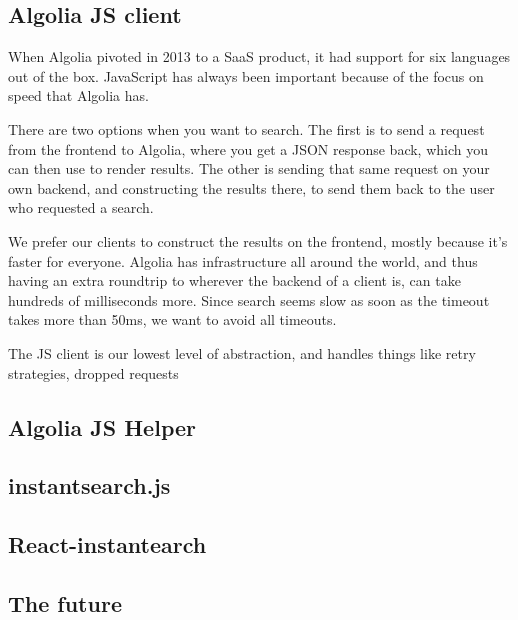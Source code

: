 \subsection{Algolia JS client} %
\label{sub:algolia_js_client}

When Algolia pivoted\cite{algolia-blog-saas} in 2013 to a SaaS product, it had support\cite{algolia-blog-lauch} for six languages out of the box. JavaScript has always been important because of the focus on speed that Algolia has.

There are two options when you want to search. The first is to send a request from the frontend to Algolia, where you get a JSON response back, which you can then use to render results. The other is sending that same request on your own backend, and constructing the results there, to send them back to the user who requested a search.

We prefer our clients to construct the results on the frontend, mostly because it's faster for everyone. Algolia has infrastructure\cite{algolia-infra} all around the world, and thus having an extra roundtrip to wherever the backend of a client is, can take hundreds of milliseconds more. Since search seems slow as soon as the timeout takes more than 50ms, we want to avoid all timeouts.

The JS client\cite{algolia-js-client} is our lowest level of abstraction, and handles things like retry strategies, dropped requests


\subsection{Algolia JS Helper} %
\label{sub:algolia_js_helper}


\subsection{instantsearch.js} %
\label{sub:instantsearch_js}


\subsection{React-instantearch} %
\label{sub:react_instantearch}


\subsection{The future} %
\label{sub:the_future}


